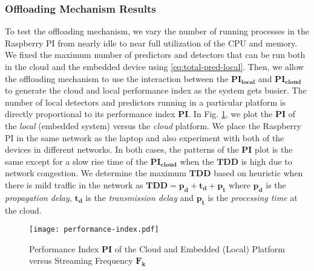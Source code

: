 \subsubsection{Offloading Mechanism Results}
To test the offloading mechanism, we vary the number of running processes in 
the Raspberry PI from nearly idle to near full utilization of the CPU and 
memory. We fixed the maximum number of predictors and detectors that can be run 
both in the cloud and the embedded device using \eqref{eq:total-pred-local}. 
Then, we allow the offloading mechanism to use the interaction between the $ 
\bm{PI_{local}} $ and $ \bm{PI_{cloud}} $ to generate the cloud and local 
performance index as the system gets busier. The number of local detectors and 
predictors running in a particular platform is directly proportional to its 
performance index $ \bm{PI} $. In Fig. \ref{fig:PI-plot}, we plot the $ \bm{PI} 
$ of the \emph{local} (embedded system) versus the \emph{cloud} platform. We 
place the Raspberry PI in the same network as the laptop and also experiment 
with both of the devices in different networks. In both cases, the patterns of 
the $ \bm{PI} $ plot is the same except for a slow rise time of the $ 
\bm{PI_{cloud}} $ when the $ \bm{TDD} $ is high due to network congestion. We 
determine the maximum $ \bm{TDD} $ based on heuristic when there is mild 
traffic in the network as $\bm{TDD}  = \bm{p_d+t_d+p_t}$  where $\bm{p_d}$ is 
the \emph{propagation 
delay}, $\bm{t_d}$ is the \emph{transmission delay} and $\bm{p_t}$ is the 
\emph{processing time} at the cloud.
\begin{figure}[!t]
	\centering
	\texttt{[image: performance-index.pdf]} 
	\caption{Performance Index $ \bm{PI} $ of the Cloud and Embedded (Local)  
	Platform versus Streaming Frequency $ \bm{F_k} $}
	\label{fig:PI-plot}
\end{figure}
